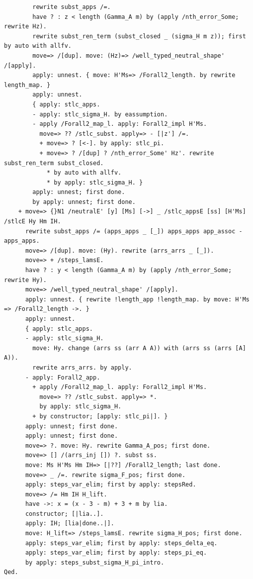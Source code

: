 \documentclass[10pt,a4paper]{amsart}
\begin{document}
\begin{lstlisting}
        rewrite subst_apps /=.
        have ? : z < length (Gamma_A m) by (apply /nth_error_Some; rewrite Hz).
        rewrite subst_ren_term (subst_closed _ (sigma_H m z)); first by auto with allfv.
        move=> /[dup]. move: (Hz)=> /well_typed_neutral_shape' /[apply].
        apply: unnest. { move: H'Ms=> /Forall2_length. by rewrite length_map. }
        apply: unnest.
        { apply: stlc_apps.
        - apply: stlc_sigma_H. by eassumption.
        - apply /Forall2_map_l. apply: Forall2_impl H'Ms.
          move=> ?? /stlc_subst. apply=> - [|z'] /=.
          + move=> ? [<-]. by apply: stlc_pi.
          + move=> ? /[dup] ? /nth_error_Some' Hz'. rewrite subst_ren_term subst_closed.
            * by auto with allfv.
            * by apply: stlc_sigma_H. }
        apply: unnest; first done.
        by apply: unnest; first done.
    + move=> {}N1 /neutralE' [y] [Ms] [->] _ /stlc_appsE [ss] [H'Ms] /stlcE Hy Hm IH.
      rewrite subst_apps /= (apps_apps _ [_]) apps_apps app_assoc -apps_apps.
      move=> /[dup]. move: (Hy). rewrite (arrs_arrs _ [_]).
      move=> + /steps_lamsE.
      have ? : y < length (Gamma_A m) by (apply /nth_error_Some; rewrite Hy).
      move=> /well_typed_neutral_shape' /[apply].
      apply: unnest. { rewrite !length_app !length_map. by move: H'Ms => /Forall2_length ->. }
      apply: unnest.
      { apply: stlc_apps.
      - apply: stlc_sigma_H.
        move: Hy. change (arrs ss (arr A A)) with (arrs ss (arrs [A] A)).
        rewrite arrs_arrs. by apply.
      - apply: Forall2_app.
        + apply /Forall2_map_l. apply: Forall2_impl H'Ms.
          move=> ?? /stlc_subst. apply=> *.
          by apply: stlc_sigma_H.
        + by constructor; [apply: stlc_pi|]. }
      apply: unnest; first done.
      apply: unnest; first done.
      move=> ?. move: Hy. rewrite Gamma_A_pos; first done.
      move=> [] /(arrs_inj []) ?. subst ss.
      move: Ms H'Ms Hm IH=> [|??] /Forall2_length; last done.
      move=> _ /=. rewrite sigma_F_pos; first done.
      apply: steps_var_elim; first by apply: stepsRed.
      move=> /= Hm IH H_lift.
      have ->: x = (x - 3 - m) + 3 + m by lia.
      constructor; [|lia..].
      apply: IH; [lia|done..|].
      move: H_lift=> /steps_lamsE. rewrite sigma_H_pos; first done.
      apply: steps_var_elim; first by apply: steps_delta_eq.
      apply: steps_var_elim; first by apply: steps_pi_eq.
      by apply: steps_subst_sigma_H_pi_intro.
Qed.


\end{lstlisting}
\end{document}
